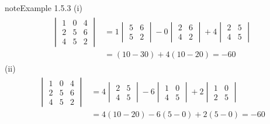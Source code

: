 \documentclass[letterpaper,10pt,english]{jupyterBook}
\begin{document}
\begin{sphinxadmonition}{note}{Example 1.5.3}
\sphinxAtStartPar
(i)
\begin{equation*}
\begin{split} \begin{align*}
    \begin{vmatrix}1 & 0 & 4 \\ 2 & 5 & 6 \\ 4 & 5 & 2 \end{vmatrix}
    &= 1\begin{vmatrix}5 & 6 \\ 5 & 2 \end{vmatrix} - 0 \begin{vmatrix} 2 & 6 \\ 4 & 2 \end{vmatrix} + 4 \begin{vmatrix}2 & 5 \\ 4 & 5 \end{vmatrix} \\
    &= (10-30) + 4(10-20)
    = -60
\end{align*} \end{split}
\end{equation*}
\sphinxAtStartPar
(ii)
\begin{equation*}
\begin{split} \begin{align*}
    \begin{vmatrix}1 & 0 & 4 \\ 2 & 5 & 6 \\ 4 & 5 & 2 \end{vmatrix}
    &= 4 \begin{vmatrix} 2 & 5 \\ 4 & 5 \end{vmatrix} - 6\begin{vmatrix}1 & 0 \\ 4 & 5 \end{vmatrix} + 2\begin{vmatrix}1 & 0 \\ 2 & 5 \end{vmatrix} \\
    &= 4(10-20) - 6(5 - 0) + 2(5 - 0)
    = -60
\end{align*} \end{split}
\end{equation*}\end{sphinxadmonition}
\end{document}
